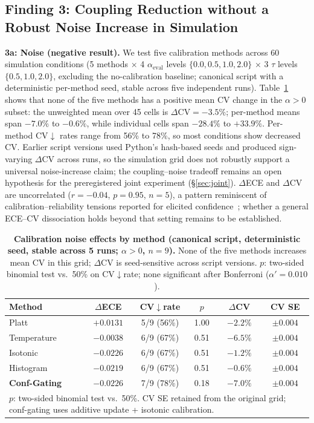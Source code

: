 \documentclass[11pt]{article}
\newcommand{\CV}{\ensuremath{\mathrm{CV}}}
\theoremstyle{definition}
\theoremstyle{remark}
\begin{document}
\subsection{Finding 3: Coupling Reduction without a Robust Noise Increase in Simulation}

\textbf{3a: Noise (negative result).} We test five calibration methods across 60 simulation conditions (5 methods $\times$ 4 $\alpha_{\text{eval}}$ levels $\{0.0, 0.5, 1.0, 2.0\}$ $\times$ 3 $\tau$ levels $\{0.5, 1.0, 2.0\}$, excluding the no-calibration baseline; canonical script with a deterministic per-method seed, stable across five independent runs). Table~\ref{tab:noise} shows that none of the five methods has a positive mean CV change in the $\alpha{>}0$ subset: the unweighted mean over 45 cells is $\Delta\CV = -3.5\%$; per-method means span $-7.0\%$ to $-0.6\%$, while individual cells span $-28.4\%$ to $+33.9\%$. Per-method CV$\downarrow$ rates range from 56\% to 78\%, so most conditions show decreased CV. Earlier script versions used Python's hash-based seeds and produced sign-varying $\Delta\CV$ across runs, so the simulation grid does not robustly support a universal noise-increase claim; the coupling--noise tradeoff remains an open hypothesis for the preregistered joint experiment (\S\ref{sec:joint}). $\Delta$ECE and $\Delta$CV are uncorrelated ($r = -0.04$, $p = 0.95$, $n{=}5$), a pattern reminiscent of calibration--reliability tensions reported for elicited confidence~\citep{tian2023calibration}; whether a general ECE--CV dissociation holds beyond that setting remains to be established.

\begin{table}[H]
\centering
\caption{\textbf{Calibration noise effects by method (canonical script, deterministic seed, stable across 5 runs; $\alpha{>}0$, $n{=}9$).} None of the five methods increases mean CV in this grid; $\Delta\CV$ is seed-sensitive across script versions. $p$: two-sided binomial test vs.\ 50\% on CV$\downarrow$rate; none significant after Bonferroni ($\alpha' = 0.010$).}
\label{tab:noise}
\begin{tabular}{@{}lccccc@{}}
\toprule
Method & $\Delta$ECE & CV$\downarrow$rate & $p$ & $\Delta$CV & CV SE \\
\midrule
Platt & $+0.0131$ & 5/9 (56\%) & 1.00 & $-2.2\%$ & $\pm 0.004$ \\
Temperature & $-0.0038$ & 6/9 (67\%) & 0.51 & $-6.5\%$ & $\pm 0.004$ \\
Isotonic & $-0.0226$ & 6/9 (67\%) & 0.51 & $-1.2\%$ & $\pm 0.004$ \\
Histogram & $-0.0219$ & 6/9 (67\%) & 0.51 & $-0.6\%$ & $\pm 0.004$ \\
\midrule
\textbf{Conf-Gating} & $\mathbf{-0.0226}$ & 7/9 (78\%) & 0.18 & $\mathbf{-7.0\%}$ & $\pm 0.004$ \\
\bottomrule
\multicolumn{6}{l}{\footnotesize $p$: two-sided binomial test vs.\ 50\%. CV SE retained from the original grid; conf-gating uses additive update + isotonic calibration.} \\
\end{tabular}
\end{table}
\end{document}
